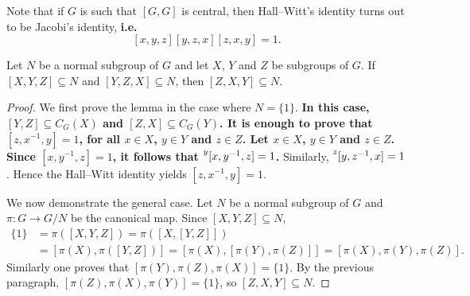 Note that if $G$ is such that $[G,G]$ is central, then Hall--Witt's identity 
turns out to be Jacobi's identity, {\bf i.e. 
\[ [x,y,z][y,z,x][z,x,y]=1.\] } 

%

\begin{lemma}
	\label{lemma:3subgrupos_general}
	Let $N$ be a normal subgroup of $G$ and let $X$, $Y$ and $Z$
	be subgroups of $G$. If $[X,Y,Z]\subseteq N$ and $[Y,Z,X]\subseteq N$, then 
	$[Z,X,Y]\subseteq N$.
\end{lemma}

\begin{proof}
	We first prove the lemma in the case where $N=\{1\}$. 	{\bf In this case,  
	$[Y,Z]\subseteq C_G(X)$ and $[Z,X]\subseteq C_G(Y)$. It
	is enough to prove that $[z,x^{-1},y]=1$, for all $x\in X$, $y\in Y$ and $z\in Z$. 
	Let $x\in X$, $y\in Y$ and $z\in Z$. Since $[x,y^{-1},z]=1$, it follows that 
	$\prescript{y}{}[x,y^{-1},z]=1$.}
	Similarly, $\prescript{z}{}[y,z^{-1},x]=1$. Hence the 
	Hall--Witt identity yields 
	$[z,x^{-1},y]=1$.

	We now demonstrate the general case. Let $N$ be a normal subgroup of $G$ 
	and $\pi\colon G\to G/N$ be the canonical map. Since $[X,Y,Z]\subseteq N$, 
	\begin{align*}
		\{1\}&=\pi([X,Y,Z])=\pi([ X,[Y,Z]])\\
		&=[\pi(X),\pi([Y,Z])]=[ \pi(X),[\pi(Y),\pi(Z)]]=[\pi(X),\pi(Y),\pi(Z)]. 
	\end{align*}
	Similarly one proves that $[\pi(Y),\pi(Z),\pi(X)]=\{1\}$. By the previous paragraph,  
	$[\pi(Z),\pi(X),\pi(Y)]=\{1\}$, so $[Z,X,Y]\subseteq N$.
\end{proof}

